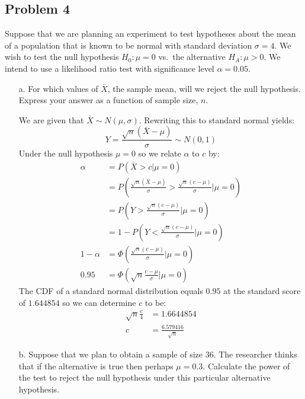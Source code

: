 \documentclass{article}
\newcommand{\1}{\mathbf{1}}
\begin{document}
\subsection*{Problem 4}
Suppose that we are planning an experiment to test hypotheses about the mean of a population that is known to be normal with standard deviation $\sigma =4$. We wish to test the null hypothesis  $H_0: \mu = 0$ vs.~the alternative $H_A: \mu> 0$. We intend to use a likelihood ratio test with significance level $\alpha = 0.05$.
\begin{itemize}
    \item[a.] For which values of $\bar{X}$, the sample mean, will we reject the null hypothesis. Express your answer as a function of sample size, $n$.
    
    We are given that $\bar X \sim N(\mu, \sigma)$. Rewriting this to standard normal yields:
    $$Y = \frac{\sqrt{n}(\bar X - \mu)}{\sigma} \sim N(0,1)$$
    Under the null hypothesis $\mu=0$ so we relate $\alpha$ to $c$ by:
    \begin{align*}
        \alpha &= P(\bar X > c |\mu=0) \\
        &= P\left( \frac{\sqrt{n}(\bar X - \mu)}{\sigma} > \frac{\sqrt{n}(c - \mu)}{\sigma} \bigg | \mu=0\right) \\
        &= P \left(Y > \frac{\sqrt{n}(c - \mu)}{\sigma}  \bigg | \mu=0 \right) \\
        &=  1- P \left(Y < \frac{\sqrt{n}(c - \mu)}{\sigma}  \bigg | \mu=0\right) \\
        1-\alpha &= \Phi\left( \frac{\sqrt{n}(c - \mu)}{\sigma}  \bigg | \mu=0 \right) \\
        0.95 & = \Phi\left( \sqrt{n}\frac{c - \mu}{\sigma}  \bigg | \mu=0 \right) 
    \end{align*}
    The CDF of a standard normal distribution equals $0.95$ at the standard score of $1.644854$ so we can determine $c$ to be:
    \begin{align*}
        \sqrt{n}\frac{c}{4} &= 1.6644854  \\
        c &= \frac{6.579416}{\sqrt{n}}
    \end{align*}
    
    \item[b.] Suppose that we plan to obtain a sample of size $36$. The researcher thinks that if the alternative is true then perhaps $\mu = 0.3$. Calculate the power of the test to reject the null hypothesis under this particular alternative hypothesis.
    

\end{itemize}
\end{document}
